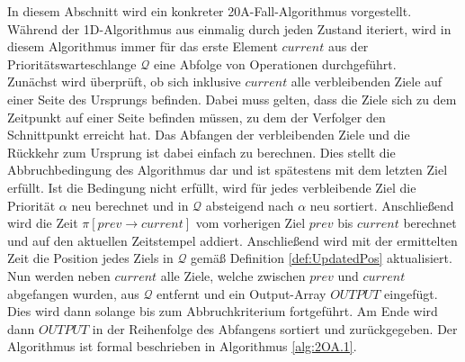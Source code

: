 \documentclass[german,version-2019-11]{uzl-thesis}
\begin{document}
In diesem Abschnitt wird ein konkreter 20A-Fall-Algorithmus vorgestellt. Während der 1D-Algorithmus aus \cite{helvig} einmalig durch jeden Zustand iteriert, wird in diesem Algorithmus immer für das erste Element $current$ aus der Prioritätswarteschlange $\mathcal{Q}$ eine Abfolge von Operationen durchgeführt. \\
Zunächst wird überprüft, ob sich inklusive $current$ alle verbleibenden Ziele auf einer Seite des Ursprungs befinden. Dabei muss gelten, dass die Ziele sich zu dem Zeitpunkt auf einer Seite befinden müssen, zu dem der Verfolger den Schnittpunkt erreicht hat. Das Abfangen der verbleibenden Ziele und die Rückkehr zum Ursprung ist dabei einfach zu berechnen. Dies stellt die Abbruchbedingung des Algorithmus dar und ist spätestens mit dem letzten Ziel erfüllt. Ist die Bedingung nicht erfüllt, wird für jedes verbleibende Ziel die Priorität $\alpha$ neu berechnet und in $\mathcal{Q}$ absteigend nach $\alpha$ neu sortiert. 
Anschließend wird die Zeit $\pi[prev\rightarrow current]$ vom vorherigen Ziel $prev$ bis $current$ berechnet und auf den aktuellen Zeitstempel addiert. Anschließend wird mit der ermittelten Zeit die Position jedes Ziels in $\mathcal{Q}$ gemäß Definition \ref{def:UpdatedPos} aktualisiert. 
Nun werden neben $current$ alle Ziele, welche zwischen $prev$ und $current$ abgefangen wurden, aus $\mathcal{Q}$ entfernt und ein Output-Array $OUTPUT$ eingefügt. Dies wird dann solange bis zum Abbruchkriterium fortgeführt. Am Ende wird dann $OUTPUT$ in der Reihenfolge des Abfangens sortiert und zurückgegeben. Der Algorithmus ist formal beschrieben in Algorithmus \ref{alg:2OA.1}.
\end{document}
